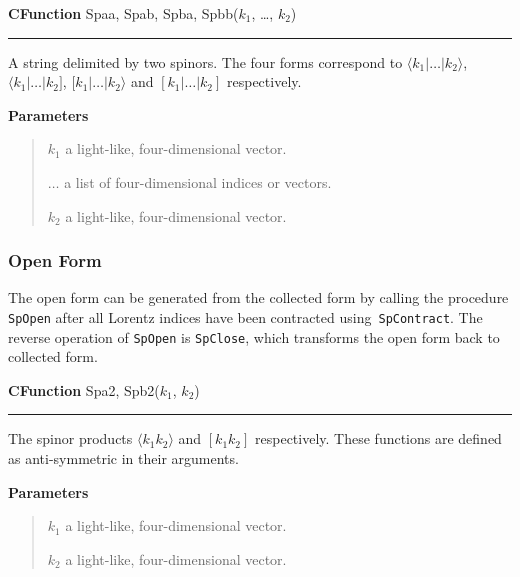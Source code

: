 \documentclass[preprint,number,12pt,sort&compress]{elsarticle}
\newcommand{\Spaa}[1]{\langle #1 \rangle}
\newcommand{\Spab}[1]{\langle #1]}
\newcommand{\Spba}[1]{[ #1 \rangle}
\newcommand{\Spbb}[1]{[ #1 ]}
\newlength{\funcindent}
\newlength{\funcwidth}
\newenvironment{Ventry}[1]%
 {\begin{list}{}{%
   \renewcommand{\makelabel}[1]{\texttt{##1:}\hfil}%
   \settowidth{\labelwidth}{\texttt{#1:}}%
   \setlength{\leftmargin}{\labelsep}%
   \addtolength{\leftmargin}{\labelwidth}}}%
 {\end{list}}
\newenvironment{CFunction}[2]{%
\hspace{.8\funcindent}\begin{boxedminipage}{\funcwidth}
	\raggedright \textbf{CFunction} #1(#2)

	\vspace{-1.5ex}

	\rule{\textwidth}{0.5\fboxrule}
	\setlength{\parskip}{2ex}
}{\end{boxedminipage}}
\newenvironment{Parameters}{%
	\setlength{\parskip}{1ex}
	\textbf{Parameters}
	\vspace{-1ex}
	\begin{quote}}{%
	\end{quote}}
\newenvironment{Also}{%
	\setlength{\parskip}{1ex}
	\textbf{See also}
	\vspace{-1ex}
	\begin{quote}}{%
	\end{quote}}
\begin{document}
\medskip
\begin{CFunction}{Spaa, Spab, Spba, Spbb}{$k_1$, \dots, $k_2$}
   A string delimited by two spinors. The four forms correspond
	to $\Spaa{k_1\vert\ldots\vert k_2}$, $\Spab{k_1\vert\ldots\vert k_2}$,
   $\Spba{k_1\vert\ldots\vert k_2}$ and $\Spbb{k_1\vert\ldots\vert k_2}$
	respectively.

	\begin{Parameters}
		\begin{Ventry}{$\ldots$}
			\item[$k_1$] a light-like, four-dimensional vector.
			\item[$\ldots$] a list of four-dimensional indices or vectors.
			\item[$k_2$] a light-like, four-dimensional vector.
		\end{Ventry}
	\end{Parameters}
\end{CFunction}

\subsubsection{Open Form}
The open form can be generated from the collected form by
calling the procedure \texttt{SpOpen} after all Lorentz indices
have been contracted using~\texttt{SpContract}. The reverse operation
of \texttt{SpOpen} is \texttt{SpClose}, which transforms the open
form back to collected form.

\medskip
\begin{CFunction}{Spa2, Spb2}{$k_1$, $k_2$}
   The spinor products $\Spaa{k_1k_2}$ and $\Spbb{k_1k_2}$ respectively.
	These functions are defined as anti-symmetric in their
	arguments.

	\begin{Parameters}
		\begin{Ventry}{$k_2$}
			\item[$k_1$] a light-like, four-dimensional vector.
			\item[$k_2$] a light-like, four-dimensional vector.
		\end{Ventry}
	\end{Parameters}
\end{CFunction}
\end{document}
